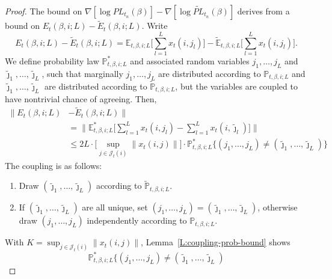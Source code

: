 \documentclass[final]{statsoc}
\begin{document}
\begin{proof}
The bound on
\(
    \nabla [\log \mathit{PL}_{t_n}(\beta) ]
    -
    \nabla [\log \widetilde{\mathit{PL}}_{t_n}(\beta) ]
\)
derives from a bound on
\(
    E_t(\beta,i;L)
    -
    \widetilde E_t(\beta,i;L).
\)
Write
\[
    E_{t}(\beta, i; L) - \widetilde{E}_t(\beta, i; L)
        =
        \mathbb{E}_{t,\beta,i;L}
            \Big[ \sum_{l=1}^L x_t(i,j_l) \Big]
        -
        \widetilde{\mathbb{E}}_{t,\beta,i;L}
            \Big[ \sum_{l=1}^L x_t(i,j_l) \Big].
\]
We define probability law $\mathbb{P}^\ast_{t,\beta,i;L}$ and
associated random variables $j_1, \ldots, j_L$ and
$\tilde \jmath_1, \ldots, \tilde \jmath_L$, such that marginally
$j_1, \ldots, j_L$ are distributed according to $\mathbb{P}_{t,\beta,i;L}$
and $\tilde \jmath_1, \ldots, \tilde \jmath_L$ are distributed according
to $\tilde{\mathbb{P}}_{t,\beta,i;L}$, but the variables are coupled to have
nontrivial chance of agreeing.  Then,
\begin{align*}
    \Big\| E_{t}(\beta, i; L) &- \widetilde{E}_t(\beta, i; L) \Big\| \\
        &=
            \Big\|
            \mathbb{E}_{t,\beta,i;L}^\ast
            \Big[
                \sum_{l=1}^L x_t(i,j_l)
                -
                \sum_{l=1}^L x_t(i, \tilde \jmath_l)
            \Big]
            \Big\| \\
        &\leq
            2 L
            \cdot
            \Big[
                \sup_{j \in \mathcal{J}_t(i)}
                \| x_t(i,j) \|
            \Big]
            \cdot
            \mathbb{P}^\ast_{t,\beta,i;L}
            \Big\{
                (j_1, \ldots, j_L)
                    \neq
                    (\tilde \jmath_1, \ldots, \tilde \jmath_L)
            \Big\}
\end{align*}
The coupling is as follows:
\begin{enumerate}
    \item Draw $(\tilde \jmath_1, \ldots, \tilde \jmath_L)$ according to
        $\tilde{\mathbb{P}}_{t,\beta,i;L}$.
    \item If $(\tilde \jmath_1, \ldots, \tilde \jmath_L)$ are all unique,
        set $(j_1, \ldots, j_L) = (\tilde \jmath_1, \ldots, \tilde \jmath_L)$,
        otherwise draw $(j_1, \ldots, j_L)$ independently according to
        $\mathbb{P}_{t,\beta,i;L}$.
\end{enumerate}
With $K = \sup_{j \in \mathcal{J}_t(i)} \| x_t(i,j) \|$,
Lemma~\ref{L:coupling-prob-bound} shows
\[
    \mathbb{P}^\ast_{t,\beta,i;L}
    \Big\{
        (j_1, \ldots, j_L)
            \neq
            (\tilde \jmath_1, \ldots, \tilde \jmath_L)
\]
\end{proof}
\end{document}
